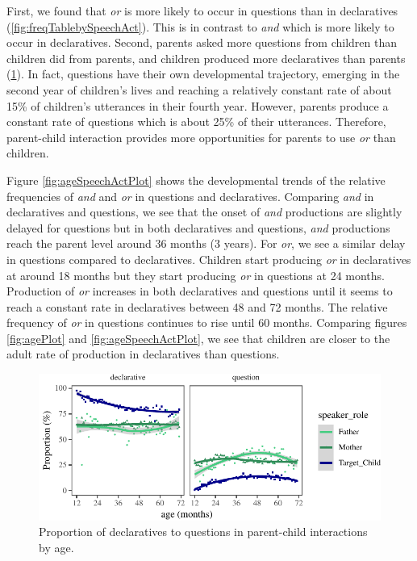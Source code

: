 \documentclass[,man,floatsintext]{apa6}
\begin{document}
First, we found that \emph{or} is more likely to occur in questions than in declaratives (\ref{fig:freqTablebySpeechAct}). This is in contrast to \emph{and} which is more likely to occur in declaratives. Second, parents asked more questions from children than children did from parents, and children produced more declaratives than parents (\ref{fig:utteranceTypeByAgePlot1}). In fact, questions have their own developmental trajectory, emerging in the second year of children's lives and reaching a relatively constant rate of about 15\% of children's utterances in their fourth year. However, parents produce a constant rate of questions which is about 25\% of their utterances. Therefore, parent-child interaction provides more opportunities for parents to use \emph{or} than children.

Figure \ref{fig:ageSpeechActPlot} shows the developmental trends of the relative frequencies of \emph{and} and \emph{or} in questions and declaratives. Comparing \emph{and} in declaratives and questions, we see that the onset of \emph{and} productions are slightly delayed for questions but in both declaratives and questions, \emph{and} productions reach the parent level around 36 months (3 years). For \emph{or}, we see a similar delay in questions compared to declaratives. Children start producing \emph{or} in declaratives at around 18 months but they start producing \emph{or} in questions at 24 months. Production of \emph{or} increases in both declaratives and questions until it seems to reach a constant rate in declaratives between 48 and 72 months. The relative frequency of \emph{or} in questions continues to rise until 60 months. Comparing figures \ref{fig:agePlot} and \ref{fig:ageSpeechActPlot}, we see that children are closer to the adult rate of production in declaratives than questions.

\begin{figure}
\centering
\includegraphics{figs/utteranceTypeByAgePlot1-1.pdf}
\caption{\label{fig:utteranceTypeByAgePlot1}Proportion of declaratives to questions in parent-child interactions by age.}
\end{figure}
\end{document}
